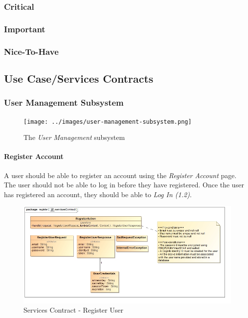 \documentclass{article}
\let\cleardoublepage\clearpage
\begin{document}
		\subsubsection{Critical}
		\subsubsection{Important}
		\subsubsection{Nice-To-Have}
	
\cleardoublepage

	\subsection{Use Case/Services Contracts}
		\subsubsection{User Management Subsystem}
			\begin{figure}[H]
				\centering
				\texttt{[image: ../images/user-management-subsystem.png]}
				\caption{The \emph{User Management} subsystem}
			\end{figure}
		\paragraph{Register Account}
			A user should be able to register an account using the \emph{Register Account} page. The user should not be able to log in before they have registered. Once the user has registered an account, they should be able to \emph{Log In (1.2)}.
			\begin{figure}[H]
				\includegraphics[width=\linewidth]{../images/ServicesContracts/register.jpg}
				\caption{Services Contract - Register User}
			\end{figure}
			
\end{document}
